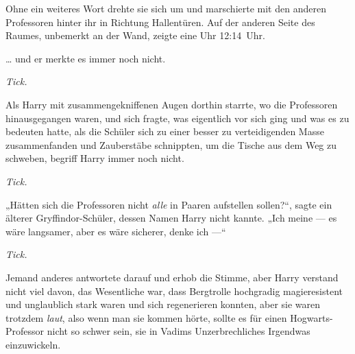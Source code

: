 
Ohne ein weiteres Wort drehte sie sich um und marschierte mit den anderen Professoren hinter ihr in Richtung Hallentüren. Auf der anderen Seite des Raumes, unbemerkt an der Wand, zeigte eine Uhr 12:14~Uhr.

\later

… und er merkte es immer noch nicht.

\emph{Tick.}

Als Harry mit zusammengekniffenen Augen dorthin starrte, wo die Professoren hinausgegangen waren, und sich fragte, was eigentlich vor sich ging und was es zu bedeuten hatte, als die Schüler sich zu einer besser zu verteidigenden Masse zusammenfanden und Zauberstäbe schnippten, um die Tische aus dem Weg zu schweben, begriff Harry immer noch nicht.

\emph{Tick.}

„Hätten sich die Professoren nicht \emph{alle} in Paaren aufstellen sollen?“, sagte ein älterer Gryffindor-Schüler, dessen Namen Harry nicht kannte.
„Ich meine — es wäre langsamer, aber es wäre sicherer, denke ich —“

\emph{Tick.}

Jemand anderes antwortete darauf und erhob die Stimme, aber Harry verstand nicht viel davon, das Wesentliche war, dass Bergtrolle hochgradig magieresistent und unglaublich stark waren und sich regenerieren konnten, aber sie waren trotzdem \emph{laut}, also wenn man sie kommen hörte, sollte es für einen Hogwarts-Professor nicht so schwer sein, sie in Vadims Unzerbrechliches Irgendwas einzuwickeln.

